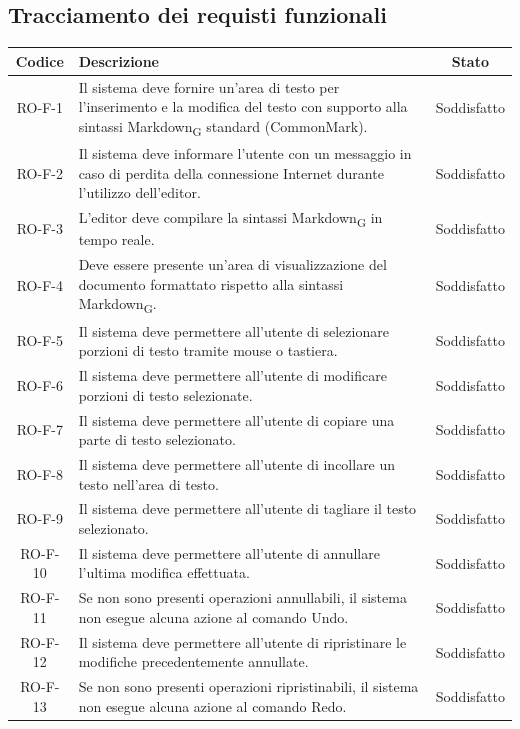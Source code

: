 \documentclass[11pt,a4paper]{article}
\newcommand{\gls}[1]{#1\textsubscript{G}}
\begin{document}
\subsection{Tracciamento dei requisti funzionali}
\begin{longtable}{|c|p{11cm}|c|}
\hline
\textbf{Codice} & \textbf{Descrizione} & \textbf{Stato}\\
\hline
\endhead
RO-F-1 & Il sistema deve fornire un’area di testo per l’inserimento e la modifica del testo con supporto alla sintassi \gls{Markdown} standard (CommonMark). & Soddisfatto \\
\hline
RO-F-2 & Il sistema deve informare l’utente con un messaggio in caso di perdita della connessione Internet durante l’utilizzo dell’editor. & Soddisfatto \\
\hline
RO-F-3 & L'editor deve compilare la sintassi \gls{Markdown} in tempo reale. & Soddisfatto \\
\hline
RO-F-4 & Deve essere presente un'area di visualizzazione del documento formattato rispetto alla sintassi \gls{Markdown}. & Soddisfatto \\
\hline
RO-F-5 & Il sistema deve permettere all'utente di selezionare porzioni di testo tramite mouse o tastiera. & Soddisfatto \\
\hline
RO-F-6 & Il sistema deve permettere all'utente di modificare porzioni di testo selezionate. & Soddisfatto \\
\hline
RO-F-7 & Il sistema deve permettere all'utente di copiare una parte di testo selezionato. & Soddisfatto \\
\hline
RO-F-8 & Il sistema deve permettere all'utente di incollare un testo nell'area di testo. & Soddisfatto \\
\hline
RO-F-9 & Il sistema deve permettere all'utente di tagliare il testo selezionato. & Soddisfatto \\
\hline
RO-F-10 & Il sistema deve permettere all'utente di annullare l'ultima modifica effettuata. & Soddisfatto \\
\hline
RO-F-11 & Se non sono presenti operazioni annullabili, il sistema non esegue alcuna azione al comando Undo. & Soddisfatto \\
\hline
RO-F-12 & Il sistema deve permettere all'utente di ripristinare le modifiche precedentemente annullate. & Soddisfatto \\
\hline
RO-F-13 & Se non sono presenti operazioni ripristinabili, il sistema non esegue alcuna azione al comando Redo. & Soddisfatto \\
\hline

\end{longtable}
\end{document}
